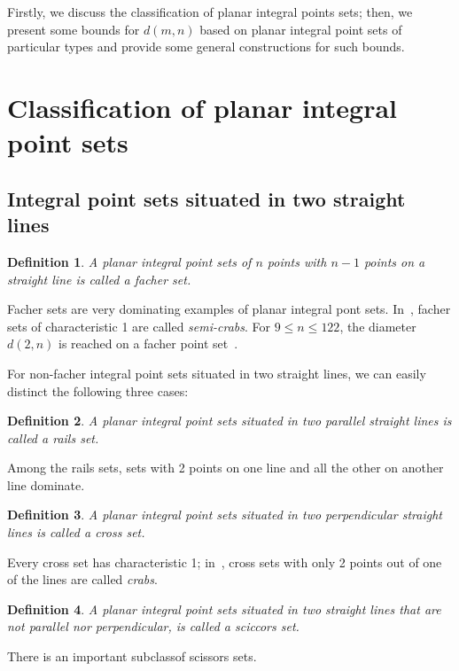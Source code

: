 \documentclass[12pt]{article}
\theoremstyle{theorem}
\theoremstyle{dfn}
\newtheorem{dfn}{Definition}
\theoremstyle{remark}
\begin{document}
Firstly, we discuss the classification of planar integral points sets;
then, we present some bounds for $d(m,n)$ based on planar integral point sets of particular types
and provide some general constructions for such bounds.

\section{Classification of planar integral point sets}

\subsection{Integral point sets situated in two straight lines}

\begin{dfn}
	A planar integral point sets of $n$ points with $n-1$ points on a straight line is called
	a \textit{facher} set.
\end{dfn}
Facher sets are very dominating examples of planar integral pont sets.
In~\cite{antonov2008maximal}, facher sets of characteristic 1 are called \textit{semi-crabs}.
For $9 \leq n \leq 122$, the diameter $d(2,n)$ is reached on a facher point set~\cite{kurz2008minimum}.

For non-facher integral point sets situated in two straight lines,
we can easily distinct the following three cases:

\begin{dfn}
	A planar integral point sets situated in two parallel straight lines
	is called a \textit{rails} set.
\end{dfn}

Among the rails sets, sets with 2 points on one line and all the other on another line dominate.

\begin{dfn}
	A planar integral point sets situated in two perpendicular straight lines
	is called a \textit{cross} set.
\end{dfn}
Every cross set has characteristic 1;
in~\cite{antonov2008maximal}, cross sets with only 2 points out of one of the lines are called \textit{crabs}.

\begin{dfn}
	A planar integral point sets situated in two straight lines
	that are not parallel nor perpendicular,
	is called a \textit{sciccors} set.
\end{dfn}

There is an important subclassof scissors sets.
\end{document}
